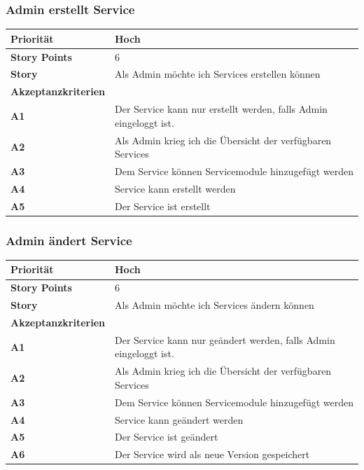 \documentclass[11pt]{scrartcl}
\begin{document}
 
 \subsubsection{Admin erstellt Service}
 \begin{tabularx}{\linewidth}{l X}
  \textbf{Priorität} & Hoch\\
  \hline
  \textbf{Story Points} & 6\\
  \hline
  \textbf{Story}& Als Admin möchte ich Services erstellen können\\
  \hline
    \textbf{Akzeptanzkriterien} & \\
    \hline
      \textbf{A1} & Der Service kann nur erstellt werden, falls Admin eingeloggt ist.\\
  \hline
  \textbf{A2} & Als Admin krieg ich die Übersicht der verfügbaren Services\\
  \hline
    \textbf{A3} & Dem Service können Servicemodule hinzugefügt werden\\
  \hline
  \textbf{A4} & Service kann erstellt werden\\
  \hline
    \textbf{A5} & Der Service ist erstellt\\
  \hline
 \end{tabularx}
 
 \subsubsection{Admin ändert Service}
 \begin{tabularx}{\linewidth}{l X}
  \textbf{Priorität} & Hoch\\
  \hline
  \textbf{Story Points} & 6\\
  \hline
  \textbf{Story}& Als Admin möchte ich Services ändern können\\
  \hline
    \textbf{Akzeptanzkriterien} & \\
    \hline
      \textbf{A1} & Der Service kann nur geändert werden, falls Admin eingeloggt ist.\\
  \hline
  \textbf{A2} & Als Admin krieg ich die Übersicht der verfügbaren Services\\
  \hline
    \textbf{A3} & Dem Service können Servicemodule hinzugefügt werden\\
  \hline
  \textbf{A4} & Service kann geändert werden\\
  \hline
    \textbf{A5} & Der Service ist geändert\\
  \hline
  \textbf{A6} & Der Service wird als neue Version gespeichert\\
  \hline
 \end{tabularx}
\end{document}
